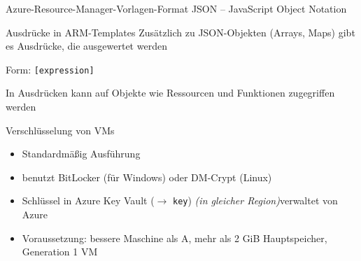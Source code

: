 


\begin{flashcard}[Definition]{Azure-Resource-Manager-Vorlagen-Format}
    JSON -- JavaScript Object Notation
\end{flashcard}

\begin{flashcard}[Definition]{Ausdrücke in ARM-Templates}
    Zusätzlich zu JSON-Objekten (Arrays, Maps) gibt es Ausdrücke, die ausgewertet werden

    \vspace{1cm}
    Form: \texttt{[expression]}

    \vspace{1cm}
    In Ausdrücken kann auf Objekte wie Ressourcen und Funktionen zugegriffen werden
\end{flashcard}



\begin{flashcard}[Definition]{Verschlüsselung von VMs}
    \begin{itemize}
        \item Standardmäßig Ausführung
        \item benutzt BitLocker (für Windows) oder DM-Crypt (Linux)
        \item Schlüssel in Azure Key Vault ($\rightarrow$ \texttt{key})\newline
            \emph{(in gleicher Region)}\newline
            [!] verwaltet von Azure
        \item Voraussetzung: bessere Maschine als A, mehr als 2 GiB Hauptspeicher, Generation 1 VM
    \end{itemize}
\end{flashcard}

